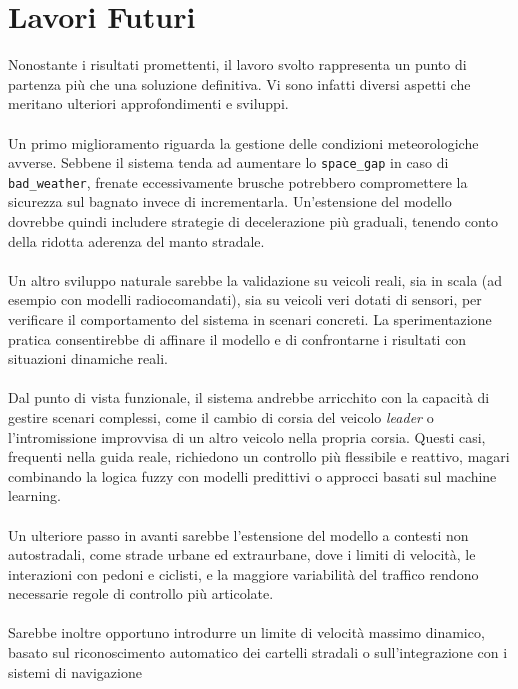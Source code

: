 \chapter{Lavori Futuri}

\noindent Nonostante i risultati promettenti, il lavoro svolto rappresenta un punto di partenza 
più che una soluzione definitiva. Vi sono infatti diversi aspetti che meritano ulteriori 
approfondimenti e sviluppi.
\\\\
\noindent Un primo miglioramento riguarda la gestione delle condizioni meteorologiche avverse.  
Sebbene il sistema tenda ad aumentare lo \texttt{space\_gap} in caso di \texttt{bad\_weather}, 
frenate eccessivamente brusche potrebbero compromettere la sicurezza 
sul bagnato invece di incrementarla.  
Un'estensione del modello dovrebbe quindi includere strategie di decelerazione più graduali, 
tenendo conto della ridotta aderenza del manto stradale.
\\\\
\noindent Un altro sviluppo naturale sarebbe la validazione su veicoli reali, sia in scala (ad esempio con modelli radiocomandati), 
sia su veicoli veri dotati di sensori, per verificare il comportamento del sistema in scenari concreti.  
La sperimentazione pratica consentirebbe di affinare il modello e di confrontarne i risultati con situazioni dinamiche reali.
\\\\
\noindent Dal punto di vista funzionale, il sistema andrebbe arricchito con la capacità di gestire scenari complessi, 
come il cambio di corsia del veicolo \emph{leader} o l'intromissione improvvisa di un altro veicolo nella propria corsia.  
Questi casi, frequenti nella guida reale, richiedono un controllo più flessibile e reattivo, 
magari combinando la logica fuzzy con modelli predittivi o approcci basati sul machine learning.
\\\\
\noindent Un ulteriore passo in avanti sarebbe l'estensione del modello a contesti non autostradali, 
come strade urbane ed extraurbane, dove i limiti di velocità, le interazioni con pedoni e ciclisti, 
e la maggiore variabilità del traffico rendono necessarie regole di controllo più articolate. 
\\\\ 
\noindent Sarebbe inoltre opportuno introdurre un limite di velocità massimo dinamico, 
basato sul riconoscimento automatico dei cartelli stradali o sull'integrazione con i sistemi di navigazione 
